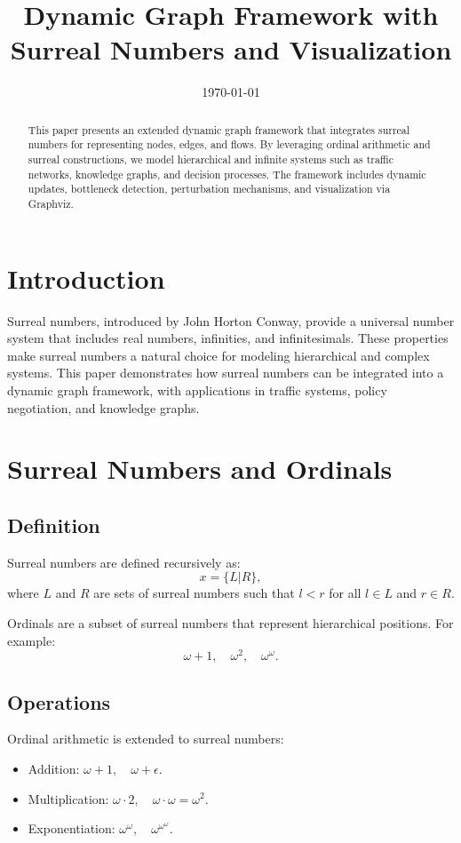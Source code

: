 \documentclass[12pt]{article}
\title{Dynamic Graph Framework with Surreal Numbers and Visualization}
\author{}
\date{\today}
\begin{document}
\maketitle

\begin{abstract}
This paper presents an extended dynamic graph framework that integrates surreal numbers for representing nodes, edges, and flows. By leveraging ordinal arithmetic and surreal constructions, we model hierarchical and infinite systems such as traffic networks, knowledge graphs, and decision processes. The framework includes dynamic updates, bottleneck detection, perturbation mechanisms, and visualization via Graphviz.
\end{abstract}

\section{Introduction}

Surreal numbers, introduced by John Horton Conway, provide a universal number system that includes real numbers, infinities, and infinitesimals. These properties make surreal numbers a natural choice for modeling hierarchical and complex systems. This paper demonstrates how surreal numbers can be integrated into a dynamic graph framework, with applications in traffic systems, policy negotiation, and knowledge graphs.

\section{Surreal Numbers and Ordinals}

\subsection{Definition}
Surreal numbers are defined recursively as:
\begin{equation}
x = \{ L | R \},
\end{equation}
where \( L \) and \( R \) are sets of surreal numbers such that \( l < r \) for all \( l \in L \) and \( r \in R \).

Ordinals are a subset of surreal numbers that represent hierarchical positions. For example:
\begin{equation}
\omega + 1, \quad \omega^2, \quad \omega^\omega.
\end{equation}

\subsection{Operations}
Ordinal arithmetic is extended to surreal numbers:
\begin{itemize}
    \item Addition: \( \omega + 1, \quad \omega + \epsilon \).
    \item Multiplication: \( \omega \cdot 2, \quad \omega \cdot \omega = \omega^2 \).
    \item Exponentiation: \( \omega^\omega, \quad \omega^{\omega^\omega} \).
\end{itemize}
\end{document}
